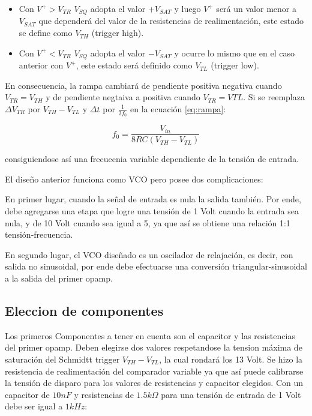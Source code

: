 \begin{itemize}
	\item Con $V^{+} > V_{TR}$ $V_{SQ}$ adopta el valor $+V_{SAT}$ y luego $V^{+}$ será un valor menor a $V_{SAT}$ que dependerá del valor de la resistencias de realimentación, este estado se define como $V_{TH}$ (trigger high).
	\item Con  $V^{+} < V_{TR}$ $V_{SQ}$ adopta el valor $-V_{SAT}$ y ocurre lo mismo que en el caso anterior con $V^{+}$, este estado será definido como $V_{TL}$ (trigger low).
\end{itemize}


En consecuencia, la rampa cambiará de pendiente positiva  negativa cuando $V_{TR} = V_{TH}$ y de pendiente negtaiva a positiva cuando $V_{TR} = V{TL}$. Si se reemplaza $\Delta V_{TR}$ por $V_{TH} - V_{TL}$ y $\Delta t $ por $\frac{1}{2f_0}$ en la ecuación \ref{eq:rampa}:

\begin{equation}\label{eq:frecuencia}
f_0 = \frac{V_{in}}{8RC(V_{TH} - V_{TL})}
\end{equation}

consiguiendose así una frecuecnia variable dependiente de la tensión de entrada. \newline

El diseño anterior funciona como VCO pero posee dos complicaciones: \newline

En primer lugar, cuando la señal de entrada es nula la salida también. Por ende, debe agregarse una etapa que logre una tensión de 1 Volt cuando la entrada sea nula, y de 10 Volt cuando sea igual a 5, ya que así se obtiene una relación 1:1 tensión-frecuencia. \newline

En segundo lugar, el VCO diseñado es un oscilador de relajación, es decir, con salida no sinusoidal, por ende debe efectuarse una conversión triangular-sinusoidal a la salida del primer opamp. 

\subsection{Eleccion de componentes}

Los primeros Componentes a tener en cuenta son el capacitor y las resistencias del primer opamp. Deben elegirse dos valores respetandose la tension máxima de saturación del Schmidtt trigger $V_{TH} - V_{TL}$, la cual rondará los 13 Volt. Se hizo la resistencia de realimentación del comparador variable ya que así puede calibrarse la tensión de disparo para los valores de resistencias y capacitor elegidos. Con un capacitor de $10nF$ y resistencias de $1.5k\Omega$ para una tensión de entrada de 1 Volt debe ser igual a $1kHz$:

